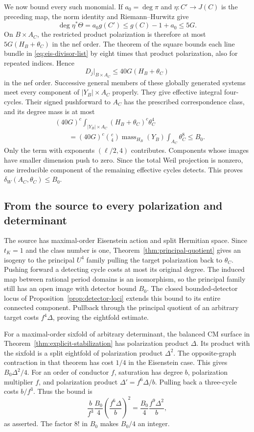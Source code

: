 We now bound every such monomial. If $a_0=\deg\pi$ and
$\eta:C'\to J(C)$ is the preceding map, the norm identity and
Riemann--Hurwitz give
\[
 \deg\eta^*\Theta=a_0g(C')
 \le g(C)-1+a_0\le5G.
\]
On $B\times A_C$, the restricted product polarization is therefore
at most $5G(H_B+\theta_C)$ in the nef order. The theorem of the
square bounds each line bundle in \eqref{eq:eis-divisor-list} by eight
times that product polarization, also for repeated indices. Hence
\[
 D_j|_{B\times A_C}\le40G(H_B+\theta_C)
\]
in the nef order. Successive general members of these globally
generated systems meet every component of $|Y_B|\times A_C$
properly. They give effective integral four-cycles. Their signed
pushforward to $A_C$ has the prescribed correspondence class, and
its degree mass is at most
\begin{align*}
 &(40G)^c\int_{|Y_B|\times A_C}
                    (H_B+\theta_C)^c\theta_C^4\\
 &\qquad=(40G)^c\binom c4
              \operatorname{mass}_{H_B}(Y_B)
              \int_{A_C}\theta_C^8
 \le B_0.
\end{align*}
Only the term with exponents $(\ell/2,4)$ contributes. Components
whose images have smaller dimension push to zero. Since the total
Weil projection is nonzero, one irreducible component of the remaining
effective cycles detects. This proves $\delta_W(A_C,\theta_C)\le B_0$.

\subsection{From the source to every polarization and determinant}

The source has maximal-order Eisenstein action and split Hermitian
space. Since $t_K=1$ and the class number is one,
Theorem~\ref{thm:principal-quotient} gives an isogeny to the principal
$U^4$ family pulling the target polarization back to $\theta_C$.
Pushing forward a detecting cycle costs at most its original degree.
The induced map between rational period domains is an isomorphism,
so the principal family still has an open image with detector bound
$B_0$. The closed bounded-detector locus of
Proposition~\ref{prop:detector-loci} extends this bound to its entire
connected component. Pullback through the principal quotient of an
arbitrary target costs $f^4\Delta$, proving the eightfold estimate.

For a maximal-order sixfold of arbitrary determinant, the balanced CM
surface in Theorem~\ref{thm:explicit-stabilization} has polarization
product $\Delta$. Its product with the sixfold is a split eightfold
of polarization product $\Delta^2$. The opposite-graph contraction
in that theorem has cost $1/4$ in the Eisenstein case. This gives
$B_0\Delta^2/4$. For an order of conductor $f$, saturation has degree
$b$, polarization multiplier $f$, and polarization product
$\Delta'=f^6\Delta/b$. Pulling back a three-cycle costs $b/f^3$.
Thus the bound is
\[
 \frac b{f^3}\frac{B_0}{4}
       \left(\frac{f^6\Delta}{b}\right)^2
 =\frac{B_0}{4}\frac{f^9\Delta^2}{b},
\]
as asserted. The factor $8!$ in $B_0$ makes $B_0/4$ an integer.
